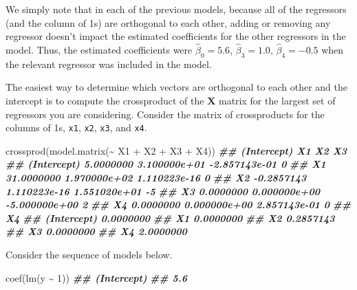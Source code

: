 \documentclass[
]{book}
\newenvironment{Shaded}{\begin{snugshade}}{\end{snugshade}}
\newcommand{\DecValTok}[1]{\textcolor[rgb]{0.00,0.00,0.81}{#1}}
\newcommand{\DocumentationTok}[1]{\textcolor[rgb]{0.56,0.35,0.01}{\textbf{\textit{#1}}}}
\newcommand{\FunctionTok}[1]{\textcolor[rgb]{0.00,0.00,0.00}{#1}}
\newcommand{\NormalTok}[1]{#1}
\newcommand{\SpecialCharTok}[1]{\textcolor[rgb]{0.00,0.00,0.00}{#1}}
\theoremstyle{definition}
\theoremstyle{definition}
\theoremstyle{definition}
\theoremstyle{definition}
\theoremstyle{remark}
\begin{document}
We simply note that in each of the previous models, because all of the
regressors (and the column of 1s) are orthogonal to each other, adding
or removing any regressor doesn't impact the estimated coefficients for
the other regressors in the model. Thus, the estimated coefficients were
\(\hat{\beta}_{0}=5.6\), \(\hat{\beta}_{3}=1.0\), \(\hat{\beta}_{4}=-0.5\)
when the relevant regressor was included in the model.

The easiest way to determine which vectors are orthogonal to each other
and the intercept is to compute the crossproduct of the \(\mathbf{X}\)
matrix for the largest set of regressors you are considering. Consider
the matrix of crossproducts for the columns of 1s, \texttt{x1}, \texttt{x2}, \texttt{x3}, and
\texttt{x4}.

\begin{Shaded}
\begin{Highlighting}[]
\FunctionTok{crossprod}\NormalTok{(}\FunctionTok{model.matrix}\NormalTok{(}\SpecialCharTok{\textasciitilde{}}\NormalTok{ X1 }\SpecialCharTok{+}\NormalTok{ X2 }\SpecialCharTok{+}\NormalTok{ X3 }\SpecialCharTok{+}\NormalTok{ X4))}
\DocumentationTok{\#\#             (Intercept)           X1            X2 X3}
\DocumentationTok{\#\# (Intercept)   5.0000000 3.100000e+01 {-}2.857143e{-}01  0}
\DocumentationTok{\#\# X1           31.0000000 1.970000e+02  1.110223e{-}16  0}
\DocumentationTok{\#\# X2           {-}0.2857143 1.110223e{-}16  1.551020e+01 {-}5}
\DocumentationTok{\#\# X3            0.0000000 0.000000e+00 {-}5.000000e+00  2}
\DocumentationTok{\#\# X4            0.0000000 0.000000e+00  2.857143e{-}01  0}
\DocumentationTok{\#\#                    X4}
\DocumentationTok{\#\# (Intercept) 0.0000000}
\DocumentationTok{\#\# X1          0.0000000}
\DocumentationTok{\#\# X2          0.2857143}
\DocumentationTok{\#\# X3          0.0000000}
\DocumentationTok{\#\# X4          2.0000000}
\end{Highlighting}
\end{Shaded}

Consider the sequence of models below.

\begin{Shaded}
\begin{Highlighting}[]
\FunctionTok{coef}\NormalTok{(}\FunctionTok{lm}\NormalTok{(y }\SpecialCharTok{\textasciitilde{}} \DecValTok{1}\NormalTok{))}
\DocumentationTok{\#\# (Intercept) }
\DocumentationTok{\#\#         5.6}
\end{Highlighting}
\end{Shaded}
\end{document}
